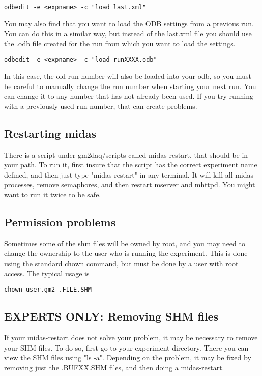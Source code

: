 \begin{verbatim}
odbedit -e <expname> -c "load last.xml"
\end{verbatim}

You may also find that you want to load the ODB settings from a previous run. You can do this in a similar way, but instead of the last.xml file you should use the .odb file created for the run from which you want to load the settings.

\begin{verbatim}
odbedit -e <expname> -c "load runXXXX.odb"
\end{verbatim}

In this case, the old run number will also be loaded into your odb, so you must be careful to manually change the run number when starting your next run. You can change it to any number that has not already been used. If you try running with a previously used run number, that can create problems.

\subsection{Restarting midas}

There is a script under gm2daq/scripts called midas-restart, that should be in your path. To run it, first insure that the script has the correct experiment name defined, and then just type "midas-restart" in any terminal. It will kill all midas processes, remove semaphores, and then restart mserver and mhttpd. You might want to run it twice to be safe.

\subsection{Permission problems}

Sometimes some of the shm files will be owned by root, and you may need to change the ownership to the user who is running the experiment. This is done using the standard chown command, but must be done by a user with root access. The typical usage is

\begin{verbatim}
chown user.gm2 .FILE.SHM
\end{verbatim}

\subsection{EXPERTS ONLY: Removing SHM files}

If your midas-restart does not solve your problem, it may be necessary ro remove your SHM files. To do so, first go to your experiment directory. There you can view the SHM files using "ls -a". Depending on the problem, it may be fixed by removing just the .BUFXX.SHM files, and then doing a midas-restart. 

